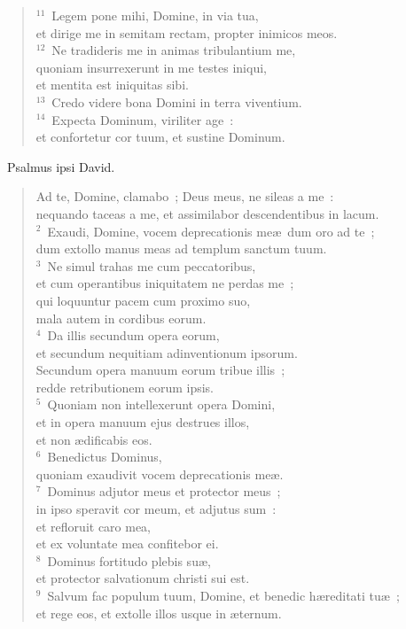 \begin{flushleft}
\begin{verse}
${}^{11}$~Legem pone mihi, Domine, in via tua,\\ et dirige me in semitam rectam, propter inimicos meos.\\
${}^{12}$~Ne tradideris me in animas tribulantium me,\\ quoniam insurrexerunt in me testes iniqui,\\ et mentita est iniquitas sibi.\\
${}^{13}$~Credo videre bona Domini in terra viventium.\\
${}^{14}$~Expecta Dominum, viriliter age~:\\ et confortetur cor tuum, et sustine Dominum.\end{verse}\end{flushleft}


~\lettrine[lines=10,image=true,loversize=0.05,lraise=-0.03]{P}{}salmus ipsi David. \begin{flushleft}\begin{verse}\vspace{6pt}Ad te, Domine, clamabo~; Deus meus, ne sileas a me~:\\ nequando taceas a me, et assimilabor descendentibus in lacum.\\
${}^{2}$~Exaudi, Domine, vocem deprecationis me\ae\ dum oro ad te~;\\ dum extollo manus meas ad templum sanctum tuum.\\
${}^{3}$~Ne simul trahas me cum peccatoribus,\\ et cum operantibus iniquitatem ne perdas me~;\\ qui loquuntur pacem cum proximo suo,\\ mala autem in cordibus eorum.\\
${}^{4}$~Da illis secundum opera eorum,\\ et secundum nequitiam adinventionum ipsorum.\\ Secundum opera manuum eorum tribue illis~;\\ redde retributionem eorum ipsis.\\
${}^{5}$~Quoniam non intellexerunt opera Domini,\\ et in opera manuum ejus destrues illos,\\ et non \ae dificabis eos.\\
${}^{6}$~Benedictus Dominus,\\ quoniam exaudivit vocem deprecationis me\ae .\\
${}^{7}$~Dominus adjutor meus et protector meus~;\\ in ipso speravit cor meum, et adjutus sum~:\\ et refloruit caro mea,\\ et ex voluntate mea confitebor ei.\\
${}^{8}$~Dominus fortitudo plebis su\ae ,\\ et protector salvationum christi sui est.\\
${}^{9}$~Salvum fac populum tuum, Domine, et benedic h\ae reditati tu\ae~;\\ et rege eos, et extolle illos usque in \ae ternum.\end{verse}\end{flushleft}


